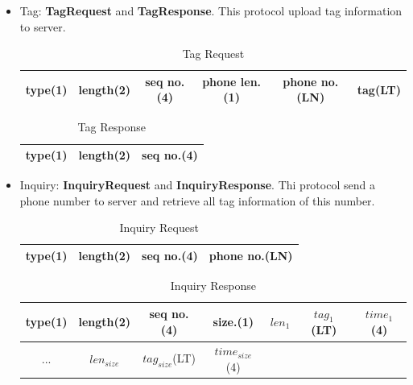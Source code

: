 \documentclass{article}
\begin{document}
    \begin{itemize}

        \item Tag: \textbf{TagRequest} and \textbf{TagResponse}.
        This protocol upload tag information to server.

        \begin{table}[H]
            \centering
            \begin{tabular}{|c|c|c|c|c|c|}
                \hline
                type(1) & length(2) & seq no.(4) & phone len.(1) & phone no.(LN) & tag(LT)\\
                \hline
            \end{tabular}
            \caption{Tag Request}
        \end{table}

        \begin{table}[H]
            \centering
            \begin{tabular}{|c|c|c|}
                \hline
                type(1) & length(2) & seq no.(4)\\
                \hline
            \end{tabular}
            \caption{Tag Response}
        \end{table}

        \item Inquiry: \textbf{InquiryRequest} and \textbf{InquiryResponse}.
        Thi protocol send a phone number to server and retrieve all tag information of this number.

        \begin{table}[H]
            \centering
            \begin{tabular}{|c|c|c|c|}
                \hline
                type(1) & length(2) & seq no.(4) & phone no.(LN)\\
                \hline
            \end{tabular}
            \caption{Inquiry Request}
        \end{table}

        \begin{table}[H]
            \centering
            \begin{tabular}{|c|c|c|c|c|c|c|}
                \hline
                type(1) & length(2) & seq no.(4) & size.(1) & $len_1$ & $tag_1$(LT) & $time_1$(4)  \\
                \hline
                ... & $len_{size}$ & $tag_{size}$(LT) & $time_{size}$(4) & & &\\
                \hline
            \end{tabular}
            \caption{Inquiry Response}
        \end{table}

    \end{itemize}
\end{document}
